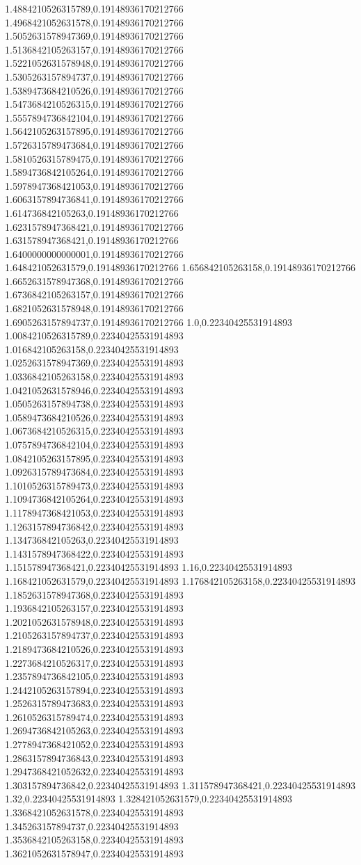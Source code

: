 1.4884210526315789,0.19148936170212766
1.4968421052631578,0.19148936170212766
1.5052631578947369,0.19148936170212766
1.5136842105263157,0.19148936170212766
1.5221052631578948,0.19148936170212766
1.5305263157894737,0.19148936170212766
1.5389473684210526,0.19148936170212766
1.5473684210526315,0.19148936170212766
1.5557894736842104,0.19148936170212766
1.5642105263157895,0.19148936170212766
1.5726315789473684,0.19148936170212766
1.5810526315789475,0.19148936170212766
1.5894736842105264,0.19148936170212766
1.5978947368421053,0.19148936170212766
1.6063157894736841,0.19148936170212766
1.614736842105263,0.19148936170212766
1.6231578947368421,0.19148936170212766
1.631578947368421,0.19148936170212766
1.6400000000000001,0.19148936170212766
1.648421052631579,0.19148936170212766
1.656842105263158,0.19148936170212766
1.6652631578947368,0.19148936170212766
1.6736842105263157,0.19148936170212766
1.6821052631578948,0.19148936170212766
1.6905263157894737,0.19148936170212766
1.0,0.22340425531914893
1.0084210526315789,0.22340425531914893
1.016842105263158,0.22340425531914893
1.0252631578947369,0.22340425531914893
1.0336842105263158,0.22340425531914893
1.0421052631578946,0.22340425531914893
1.0505263157894738,0.22340425531914893
1.0589473684210526,0.22340425531914893
1.0673684210526315,0.22340425531914893
1.0757894736842104,0.22340425531914893
1.0842105263157895,0.22340425531914893
1.0926315789473684,0.22340425531914893
1.1010526315789473,0.22340425531914893
1.1094736842105264,0.22340425531914893
1.1178947368421053,0.22340425531914893
1.1263157894736842,0.22340425531914893
1.134736842105263,0.22340425531914893
1.1431578947368422,0.22340425531914893
1.151578947368421,0.22340425531914893
1.16,0.22340425531914893
1.168421052631579,0.22340425531914893
1.176842105263158,0.22340425531914893
1.1852631578947368,0.22340425531914893
1.1936842105263157,0.22340425531914893
1.2021052631578948,0.22340425531914893
1.2105263157894737,0.22340425531914893
1.2189473684210526,0.22340425531914893
1.2273684210526317,0.22340425531914893
1.2357894736842105,0.22340425531914893
1.2442105263157894,0.22340425531914893
1.2526315789473683,0.22340425531914893
1.2610526315789474,0.22340425531914893
1.2694736842105263,0.22340425531914893
1.2778947368421052,0.22340425531914893
1.2863157894736843,0.22340425531914893
1.2947368421052632,0.22340425531914893
1.303157894736842,0.22340425531914893
1.311578947368421,0.22340425531914893
1.32,0.22340425531914893
1.328421052631579,0.22340425531914893
1.3368421052631578,0.22340425531914893
1.345263157894737,0.22340425531914893
1.3536842105263158,0.22340425531914893
1.3621052631578947,0.22340425531914893
